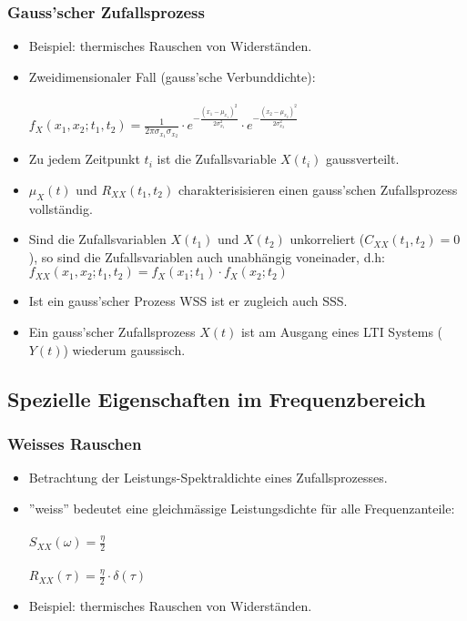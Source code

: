 \documentclass[10pt, a4paper]{article}
\begin{document}
\subsubsection{Gauss'scher Zufallsprozess}
\begin{itemize}
  \item Beispiel: thermisches Rauschen von Widerst\"anden.
  \item Zweidimensionaler Fall (gauss'sche Verbunddichte): \\ \\
        $f_{X}(x_{1},x_{2};t_{1},t_{2}) = \frac{1}{2\pi \sigma_{x_{1}}\sigma_{x_{2}}} \cdot
                                      e^{-\frac{(x_{1}-\mu_{x_{1}})^{2}}{2 \sigma^{2}_{x_{1}}}} \cdot
                                      e^{-\frac{(x_{2}-\mu_{x_{2}})^{2}}{2 \sigma^{2}_{x_{2}}}}$
  \item Zu jedem Zeitpunkt $t_{i}$ ist die Zufallsvariable $X(t_{i})$ gaussverteilt.
  \item $\mu_{X}(t)$ und $R_{XX}(t_{1}, t_{2})$ charakterisisieren einen gauss'schen Zufallsprozess
        vollst\"andig.
  \item Sind die Zufallsvariablen $X(t_{1})$ und $X(t_{2})$ unkorreliert ($C_{XX}(t_{1},t_{2})=0$),
        so sind die Zufallsvariablen auch unabh\"angig voneinader, d.h:
        $f_{XX}(x_{1},x_{2}; t_{1},t_{2}) = f_{X}(x_{1};t_{1}) \cdot f_{X}(x_{2};t_{2}) $ 
  \item Ist ein gauss'scher Prozess WSS ist er zugleich auch SSS.
  \item Ein gauss'scher Zufallsprozess $X(t)$ ist am Ausgang eines LTI Systems ($Y(t)$) wiederum gaussisch.
\end{itemize} 

\subsection{Spezielle Eigenschaften im Frequenzbereich}
\subsubsection{Weisses Rauschen}
\begin{itemize}
  \item Betrachtung der Leistungs-Spektraldichte eines Zufallsprozesses.
  \item ''weiss'' bedeutet eine gleichm\"assige Leistungsdichte f\"ur alle Frequenzanteile: \\ \\
        $S_{XX}(\omega) = \frac{\eta}{2}$ \\ \\
        $R_{XX}(\tau) =  \frac{\eta}{2} \cdot \delta(\tau)$ 
  \item Beispiel: thermisches Rauschen von Widerst\"anden.
\end{itemize} 
\end{document}
